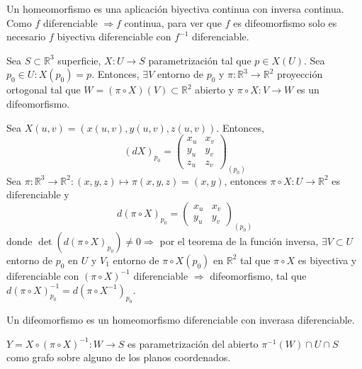 \begin{obs}
  Un homeomorfismo es una aplicación biyectiva continua con inversa continua. Como $f$ diferenciable $\Rightarrow f$ continua, para ver que $f$ es difeomorfismo solo es necesario $f$ biyectiva diferenciable con $f^{-1}$ diferenciable.
\end{obs}

\begin{prop}[]
  Sea $S \subset \mathbb{R}^{3}$ superficie, $X: U \to S$ parametrización tal que $p \in X(U)$. Sea $p_{0} \in U: X(p_{0}) = p$. Entonces, $\exists V$ entorno de $p_{0}$ y $\pi: \mathbb{R}^{3} \to \mathbb{R}^{2}$ proyección ortogonal tal que $W = (\pi \circ X)(V) \subset \mathbb{R}^{2}$ abierto y $\pi \circ X: V \to W$ es un difeomorfismo.
\end{prop}

\begin{dem}
  Sea $X(u, v) = (x(u, v), y(u, v), z(u, v))$. Entonces, 
  \[ 
    (d X)_{p_{0}} = 
    \begin{pmatrix}
       x_{u} & x_{v} \\
       y_{u} & y_{v} \\
       z_{u} & z_{v} 
     \end{pmatrix}_{(p_{0})}
  \] 
  Sea $\pi : \mathbb{R}^{3} \to \mathbb{R}^{2} : (x, y, z) \mapsto \pi(x, y, z) = (x, y)$, entonces $\pi \circ X : U \to \mathbb{R}^{2}$ es diferenciable y
  \[ 
    d(\pi \circ X)_{p_{0}} = 
    \begin{pmatrix}
       x_{u} & x_{v} \\
       y_{u} & y_{v}
     \end{pmatrix}_{(p_{0})}
  \] 
  donde $\det(d(\pi \circ X)_{p_{0}}) \neq 0 \Rightarrow$ por el teorema de la función inversa, $\exists V \subset U$ entorno de $p_{0}$ en $U$ y $V_{1}$ entorno de $\pi \circ X (p_{0})$ en $\mathbb{R}^{2}$ tal que $\pi \circ X$ es biyectiva y diferenciable con $(\pi \circ X)^{-1}$ diferenciable $\Rightarrow$ difeomorfismo, tal que $d(\pi \circ X)_{p_{0}}^{-1} = d(\pi \circ X ^{-1})_{p_{0}}$.
\end{dem}

\begin{obs}
  Un difeomorfismo es un homeomorfismo diferenciable con inverasa diferenciable.
\end{obs}

\begin{obs}
  $Y = X \circ ( \pi \circ X)^{-1} : W \to S$ es parametrización del abierto $\pi^{-1}(W)\cap U \cap S$ como grafo sobre alguno de los planos coordenados.
\end{obs}

